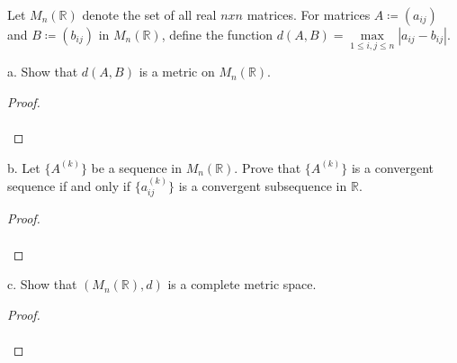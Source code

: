 Let $M_n(\mathbb{R})$ denote the set of all real $n x n$ matrices. For matrices
$A \coloneqq (a_{ij})$ and $B \coloneqq (b_{ij})$ in $M_n{(\mathbb{R})}$, define
the function $d(A, B) = \max\limits_{1 \le i,j \le n}{|a_{ij} - b_{ij}|}$.

a.  Show that $d(A, B)$ is a metric on $M_n(\mathbb{R})$. \ \\

    \begin{proof}\renewcommand{\qedsymbol}{}\ \\\\
    \end{proof}

    \pagebreak

b.  Let $\{A^{(k)}\}$ be a sequence in $M_n(\mathbb{R})$. Prove that
    $\{A^{(k)}\}$ is a convergent sequence if and only if $\{a_{ij}^{(k)}\}$ is
    a convergent subsequence in $\mathbb{R}$.\ \\

    \begin{proof}\renewcommand{\qedsymbol}{}\ \\\\
    \end{proof}

    \pagebreak

c.  Show that $\left(M_n(\mathbb{R}), d\right)$ is a complete metric space.

    \begin{proof}\renewcommand{\qedsymbol}{}\ \\\\
    \end{proof}

    \pagebreak